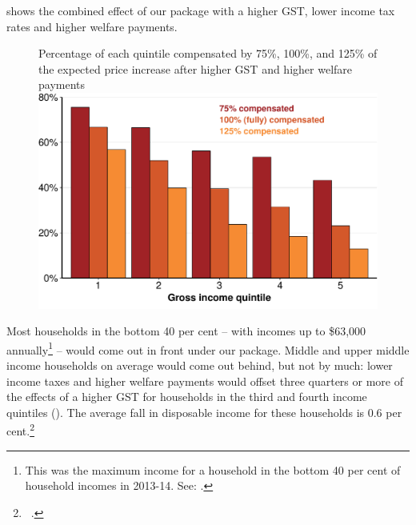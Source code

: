 \documentclass{grattanAlpha}
\begin{document}
 shows the combined effect of our package with a higher GST, lower income tax rates and higher welfare payments.

\begin{figure}
%
{Percentage of each quintile compensated by 75\%, 100\%, and 125\% of the expected price increase after higher GST and higher welfare payments}
\includegraphics[width=\columnwidth]{atlas/figure/GST-Figure-9-1.pdf}

\end{figure}

Most households in the bottom 40 per cent – with incomes up to \$63,000 annually\footnote{This was the maximum income for a household in the bottom 40 per cent of household incomes in 2013-14. See: \textcite{ABS2015HouseholdIncomeWealth1314}.}  – would come out in front under our package. Middle and upper middle income households on average would come out behind, but not by much: lower income taxes and higher welfare payments would offset three quarters or more of the effects of a higher GST for households in the third and fourth income quintiles (). The average fall in disposable income for these households is 0.6 per cent.\footnote{\gao\ \textcite{ABS2013-HES-2011-12-CURF}.}  
\end{document}
